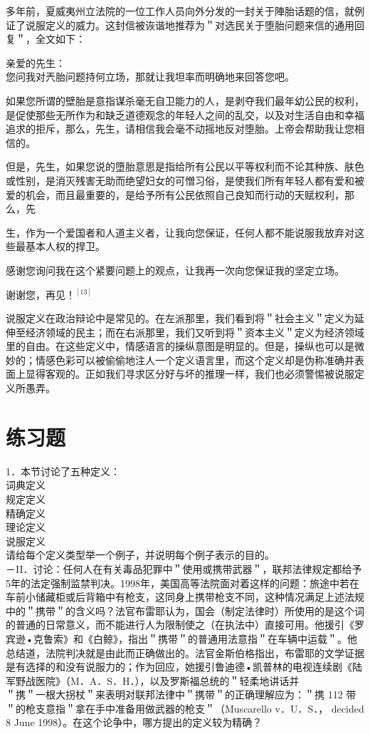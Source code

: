 多年前，夏威夷州立法院的一位工作人员向外分发的一封关于陣胎话题的信，就例证了说服定义的威力。这封信被诙谐地推荐为＂对选民关于堕胎问题来信的通用回复＂，全文如下：

亲爱的先生：\\
您问我对兲胎问题持何立场，那就让我坦率而明确地来回答您吧。

如果您所谓的壁胎是意指谋杀毫无自卫能力的人，是剥夺我们最年幼公民的权利，是促使那些无所作为和缺乏道德观念的年轻人之间的乱交，以及对生活自由和幸福追求的拒斥，那么，先生，请相信我会毫不动摇地反对堕胎。上帝会帮助我让您相信的。

但是，先生，如果您说的墮胎意思是指给所有公民以平等权利而不论其种族、肤色或性别，是消灭残害无助而绝望妇女的可憎习俗，是使我们所有年轻人都有爱和被爱的机会，而且最重要的，是给予所有公民依照自己良知而行动的天赋权利，那么，先

生，作为一个爱国者和人道主义者，让我向您保证，任何人都不能说服我放弃对这些最基本人权的捍卫。

感谢您询问我在这个紧要问题上的观点，让我再一次向您保证我的坚定立场。

谢谢您，再见！${ }^{[13]}$

说服定义在政治辩论中是常见的。在左派那里，我们看到将＂社会主义＂定义为延伸至经济领域的民主；而在右派那里，我们又听到将＂资本主义＂定义为经济领域里的自由。在这些定义中，情感语言的操纵意图是明显的。但是，操纵也可以是微妙的；情感色彩可以被偷偷地注人一个定义语言里，而这个定义却是伪称准确并表面上显得客观的。正如我们寻求区分好与坏的推理一样，我们也必须警惕被说服定义所愚弄。

\section*{练习题}
1．本节讨论了五种定义：\\
词典定义\\
规定定义\\
精确定义\\
理论定义\\
说服定义\\
请给每个定义类型举一个例子，并说明每个例子表示的目的。\\
－II．讨论：任何人在有关毒品犯罪中＂使用或携带武器＂，联邦法律规定都给予5年的法定强制监禁判决。1998年，美国高等法院面对着这样的问题：旅途中若在车前小储藏柜或后背箱中有枪支，这同身上携带枪支不同，这种情况满足上述法规中的＂携带＂的含义吗？法官布雷耶认为，国会（制定法律时）所使用的是这个词的普通的日常意义，而不能进行人为限制使之（在执法中）直接可用。他援引《罗宾逊•克鲁索》和《白鲸》，指出＂携带＂的普通用法意指＂在车辆中运载＂。他总结道，法院判决就是由此而正确做出的。法官金斯伯格指出，布雷耶的文学证据是有选择的和没有说服力的；作为回应，她援引鲁迪德•凯普林的电视连续剧《陆军野战医院》（M．A．S．H．），以及罗斯福总统的＂轻柔地讲话并\\
＂携＂一根大拐杖＂来表明对联邦法律中＂携带＂的正确理解应为：＂携 112 带＂的枪支意指＂拿在手中准备用做武器的枪支＂（Muscarello v．U．S．， decided 8 June 1998）。在这个论争中，哪方提出的定义较为精确？

